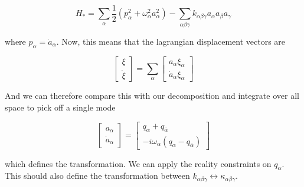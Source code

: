 \begin{equation}
H_{\ast} = \sum_{\alpha} \frac{1}{2}\left( p_{\alpha}^2 + \omega_{\alpha}^2 a_{\alpha}^2 \right) - \sum_{\alpha\beta\gamma} k_{\alpha\beta\gamma} a_{\alpha} a_{\beta} a_{\gamma}
\end{equation}

where $p_{\alpha} = \dot{a}_{\alpha}$. Now, this means that the lagrangian displacement vectors are

\begin{equation}
\begin{bmatrix}\xi \\ \dot{\xi}\end{bmatrix}=\sum_{\alpha} \begin{bmatrix} a_{\alpha}\xi_{\alpha} \\ \dot{a}_{\alpha}\xi_{\alpha} \end{bmatrix}
\end{equation}

And we can therefore compare this with our decomposition and integrate over all space to pick off a single mode

\begin{equation}
\begin{bmatrix} a_{\alpha} \\ \dot{a}_{\alpha} \end{bmatrix}
=
\begin{bmatrix} q_{\alpha} + q_{\bar{\alpha}} \\ -i\omega_{\alpha}\left(q_{\alpha} - q_{\bar{\alpha}} \right) \end{bmatrix}
\end{equation}

which defines the transformation. We can apply the reality constraints on $q_{\alpha}$. This should also define the transformation between $k_{\alpha\beta\gamma} \leftrightarrow \kappa_{\alpha\beta\gamma}$.

